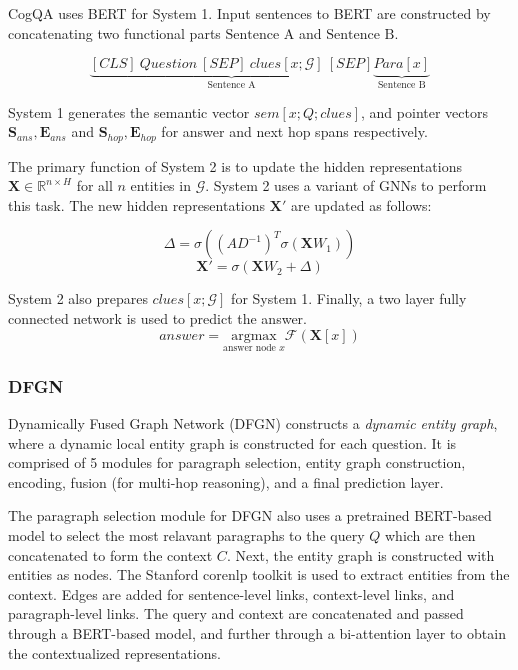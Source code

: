 \documentclass[sigplan,screen]{acmart}
\begin{document}
CogQA uses BERT \cite{RN153} for System 1. Input sentences to BERT are constructed by concatenating two functional parts 
$\text{Sentence A}$ and $\text{Sentence B}$.

$$
\underbrace{{[CLS]\: Question \: [SEP]\: clues[x; \mathcal{G}]\: [SEP]}}_{\text{Sentence A}} \underbrace{{Para[x]}}_{\text{Sentence B}}
$$

System 1 generates the semantic vector $sem[x; Q; clues]$, and pointer vectors 
$\boldsymbol{S}_{ans} , \boldsymbol{E}_{ans} $ and $\boldsymbol{S}_{hop} , \boldsymbol{E}_{hop} $ for answer and next hop spans respectively.

The primary function of System 2 is to update the hidden representations $\boldsymbol{X} \in \mathbb{R}^{n \times H}$ for all $n$ entities in $\mathcal{G}$.
System 2 uses a variant of GNNs \cite{RN2} to perform this task. The new hidden representations $\boldsymbol{X'}$ are updated as follows:

$$
\Delta = \sigma((AD^{-1})^T \sigma (\boldsymbol{X}W_1))
$$
$$
\boldsymbol{X'} = \sigma(\boldsymbol{X}W_2 + \Delta)
$$

System 2 also prepares $clues[x; \mathcal{G}]$ for System 1. Finally, a two layer fully connected network is used to predict the answer.
$$
answer = \underset{\text{answer node }x}{\mathrm{argmax}}  \mathcal{F}(\boldsymbol{X}[x])
$$

\subsubsection{DFGN}
Dynamically Fused Graph Network (DFGN) \cite{RN122} constructs a \emph{dynamic entity graph}, where a dynamic local entity graph is 
constructed for each question. It is comprised of 5 modules for paragraph selection, entity graph construction, encoding, fusion (for multi-hop reasoning),
and a final prediction layer.

The paragraph selection module for DFGN also uses a pretrained BERT-based model \cite{RN153} to select the most relavant paragraphs to the query $Q$ which 
are then concatenated to form the context $C$. Next, the entity graph is constructed with entities as nodes. The Stanford corenlp toolkit \cite{RN170} is used 
to extract entities from the context. Edges are added for sentence-level links, context-level links, and paragraph-level links. The query and context are 
concatenated and passed through a BERT-based model, and further through a bi-attention layer to obtain the contextualized representations.
\end{document}
